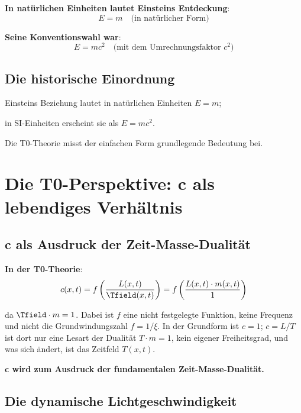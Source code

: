 	\textbf{In natürlichen Einheiten lautet Einsteins Entdeckung}:
	\begin{equation}
		E = m \quad \text{(in natürlicher Form)}
	\end{equation}
	
	\textbf{Seine Konventionswahl war}:
	\begin{equation}
		E = mc^2 \quad \text{(mit dem Umrechnungsfaktor $c^2$)}
	\end{equation}
	
	\subsection{Die historische Einordnung}
	
	\begin{tcolorbox}[colback=blue!5!white,colframe=blue!75!black,title=Eine Beobachtung]
		Einsteins Beziehung lautet in natürlichen Einheiten $E = m$; 
		
		in SI-Einheiten erscheint sie als $E = mc^2$.
		
		Die T0-Theorie misst der einfachen Form grundlegende Bedeutung bei.
	\end{tcolorbox}
	
	\section{Die T0-Perspektive: c als lebendiges Verhältnis}
	
	\subsection{c als Ausdruck der Zeit-Masse-Dualität}
	
	\textbf{In der T0-Theorie}:
	\begin{equation}
		c(x,t) = f\left(\frac{L(x,t)}{\Tfield(x,t)}\right) = f\left(\frac{L(x,t) \cdot m(x,t)}{1}\right)
	\end{equation}

	da $\Tfield \cdot m = 1$. Dabei ist $f$ eine nicht festgelegte Funktion, keine Frequenz und nicht die Grundwindungszahl $f = 1/\xi$. In der Grundform ist $c = 1$; $c = L/T$ ist dort nur eine Lesart der Dualität $T\cdot m = 1$, kein eigener Freiheitsgrad, und was sich ändert, ist das Zeitfeld $T(x,t)$.
	
	\textbf{c wird zum Ausdruck der fundamentalen Zeit-Masse-Dualität.}
	
	\subsection{Die dynamische Lichtgeschwindigkeit}
	
